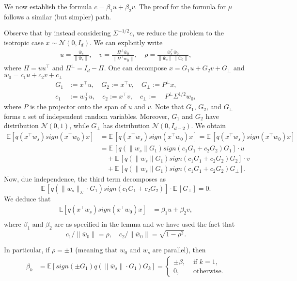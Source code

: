 We now establish the formula $c=\beta_1 u + \beta_2 v$. The proof for the formula for $\mu$ follows a similar (but simpler) path.

Observe that by instead considering $\Sigma^{-1/2}c$, we reduce the problem to the isotropic case $x \sim \mathcal N(0,I_d)$. We can explicitly write
\begin{align}
    u = \frac{\bar w_s}{\|\bar w_s\|},\quad v = \frac{\Pi^\perp \bar w_0}{\|\Pi^\perp\bar w_0\|},\quad \rho = \frac{\bar w_s^\top \bar w_0}{\|\bar w_s\|\|\bar w_0\|},
\end{align}
where $\Pi=uu^\top$ and $\Pi^\perp=I_d-\Pi$. One can decompose $x=G_1u + G_2v + G_\perp$ and $\bar w_0 = c_1u + c_2v + c_\perp$
\begin{align}
    G_1 &:= x^\top u, \quad G_2 := x^\top v,\quad G_\perp := P^\perp x,\\
    c_1 &:= w_0^\top u,\quad c_2:= x^\top v,\quad c_\perp :=\quad P^\perp \Sigma^{1/2}w_0,
\end{align}
where $P$ is the projector onto the span of $u$ and $v$.
Note that $G_1$, $G_2$, and $G_\perp$ forms a set of independent random variables. Moreover, $G_1$ and $G_2$ have distribution $\mathcal N(0,1)$, while $G_\perp$ has distribution $\mathcal N(0,I_{d-2})$. We obtain
\begin{align}
    \mathbb E[q(x^\top w_s)sign(x^\top w_0)x] &= \mathbb E\,[q(x^\top w_s)sign(x^\top w_0)x] = \mathbb E\,[q(x^\top w_s)sign(x^\top w_0)x]\\
    &= \mathbb E\,[q(\|w_s\|G_1)sign(c_1 G_1 + c_2G_2)G_1]\cdot u\\
    &\quad + \mathbb E\,[q(\|w_s\|G_1)sign(c_1 G_1 + c_2G_2)G_2]\cdot v\\
    &\quad + \mathbb E\,[q(\|w_s\|G_1)sign(c_1 G_1 + c_2G_2)G_\perp].
\end{align}
Now, due independence, the third term decomposes as
$$
\mathbb E\,[q(\|w_s\|_\Sigma \cdot G_1)sign(c_1 G_1 + c_2G_2)]\cdot \mathbb E\,[G_\perp]=0.
$$
We deduce that
\begin{align*}
\mathbb E[q(x^\top w_s)sign(x^\top w_0)x] &= \beta_1 u + \beta_2 v,\\
\end{align*}
where $\beta_1$ and $\beta_2$ are as specified in the lemma
and we have used the fact that
$$
c_1/\|\bar w_0\| = \rho,\quad c_2/\|\bar w_0\| = \sqrt{1-\rho^2}.
$$

In particular, if $\rho = \pm 1$ (meaning that $w_0$ and $w_s$ are parallel), then 
\begin{align}
    \beta_k &= \mathbb E\left[sign(\pm G_1)q(\|\bar w_s\|\cdot G_1)G_k\right] = \begin{cases}
        \pm \beta,&\mbox{ if }k=1,\\
        0,&\mbox{ otherwise.}
    \end{cases}
\end{align}

